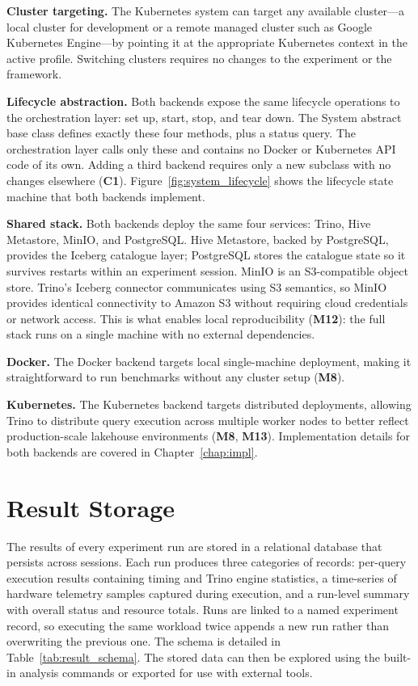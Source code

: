 \documentclass{l4proj}
\begin{document}
\textbf{Cluster targeting.} The Kubernetes system can target any available cluster---a local cluster for development or a remote managed cluster such as Google Kubernetes Engine---by pointing it at the appropriate Kubernetes context in the active profile. Switching clusters requires no changes to the experiment or the framework.

\textbf{Lifecycle abstraction.} Both backends expose the same lifecycle operations to the orchestration layer: set up, start, stop, and tear down. The System abstract base class defines exactly these four methods, plus a status query. The orchestration layer calls only these and contains no Docker or Kubernetes API code of its own. Adding a third backend requires only a new subclass with no changes elsewhere (\textbf{C1}). Figure~\ref{fig:system_lifecycle} shows the lifecycle state machine that both backends implement.

\textbf{Shared stack.} Both backends deploy the same four services: Trino, Hive Metastore, MinIO, and PostgreSQL. Hive Metastore, backed by PostgreSQL, provides the Iceberg catalogue layer; PostgreSQL stores the catalogue state so it survives restarts within an experiment session. MinIO is an S3-compatible object store. Trino's Iceberg connector communicates using S3 semantics, so MinIO provides identical connectivity to Amazon S3 without requiring cloud credentials or network access. This is what enables local reproducibility (\textbf{M12}): the full stack runs on a single machine with no external dependencies.

\textbf{Docker.} The Docker backend targets local single-machine deployment, making it straightforward to run benchmarks without any cluster setup (\textbf{M8}).

\textbf{Kubernetes.} The Kubernetes backend targets distributed deployments, allowing Trino to distribute query execution across multiple worker nodes to better reflect production-scale lakehouse environments (\textbf{M8}, \textbf{M13}). Implementation details for both backends are covered in Chapter~\ref{chap:impl}.


\section{Result Storage}
\label{sec:result_storage}

The results of every experiment run are stored in a relational database that persists across sessions. Each run produces three categories of records: per-query execution results containing timing and Trino engine statistics, a time-series of hardware telemetry samples captured during execution, and a run-level summary with overall status and resource totals. Runs are linked to a named experiment record, so executing the same workload twice appends a new run rather than overwriting the previous one. The schema is detailed in Table~\ref{tab:result_schema}. The stored data can then be explored using the built-in analysis commands or exported for use with external tools.
\end{document}
